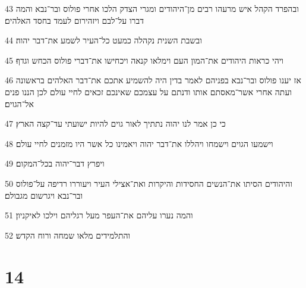 \par 43 ובהפרד הקהל איש מרעהו רבים מן־היהודים ומגרי הצדק הלכו אחרי פולוס ובר־נבא והמה דברו על־לבם ויזהירום לעמד בחסד האלהים׃
\par 44 ובשבת השנית נקהלה כמעט כל־העיר לשמע את־דבר יהוה׃
\par 45 ויהי כראות היהודים את־המון העם וימלאו קנאה ויכחישו את־דברי פולוס הכחש וגדף׃
\par 46 אז יענו פולוס ובר־נבא בפניהם לאמר בדין היה להשמיע אתכם את־דבר האלהים בראשונה ועתה אחרי אשר־מאסתם אותו ודנתם על עצמכם שאינכם זכאים לחיי עולם לכן הננו פנים אל־הגוים׃
\par 47 כי כן אמר לנו יהוה נתתיך לאור גוים להיות ישועתי עד־קצה הארץ׃
\par 48 וישמעו הגוים וישמחו ויהללו את־דבר יהוה ויאמינו כל אשר היו מזמנים לחיי עולם׃
\par 49 ויפרץ דבר־יהוה בכל־המקום׃
\par 50 והיהודים הסיתו את־הנשים החסידות והיקרות ואת־אצילי העיר ויעוררו רדיפה על־פולוס ובר־נבא ויגרשום מגבולם׃
\par 51 והמה נערו עליהם את־העפר מעל רגליהם וילכו לאיקניון׃
\par 52 והתלמידים מלאו שמחה ורוח הקדש׃

\chapter{14}

